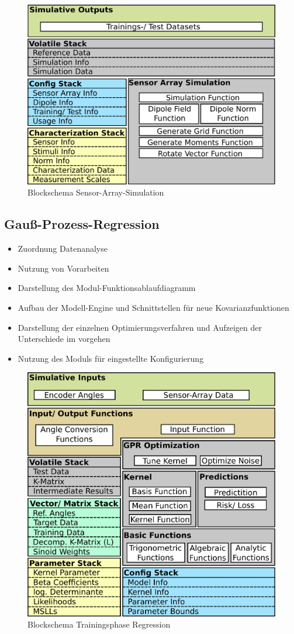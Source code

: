 \begin{figure}[tbph]
	\centering
	\includegraphics[width=0.7\linewidth]{chapters/images/3-SW-E-OExp/Blockschema_Sensor-Array}
	\caption[Blockschema Sensor-Array-Simulation]{Blockschema Sensor-Array-Simulation}
	\label{fig:blockschemasensor-array}
\end{figure}


\clearpage


\subsection{Gauß-Prozess-Regression}\label{sub:gpr-av}
	\begin{itemize}
		\item Zuordnung Datenanalyse
		\item Nutzung von Vorarbeiten
		\item Darstellung des Modul-Funktionsablaufdiagramm
		\item Aufbau der Modell-Engine und Schnittstellen für neue Kovarianzfunktionen
		\item Darstellung der einzelnen Optimierungsverfahren und Aufzeigen der Unterschiede im vorgehen
 		\item Nutzung des Moduls für eingestellte Konfigurierung
	\end{itemize}


\begin{figure}[tbph]
	\centering
	\includegraphics[width=0.7\linewidth]{chapters/images/3-SW-E-OExp/Blockschema_Trainingsphase}
	\caption[Blockschema Trainingsphase Regression]{Blockschema Trainingsphase Regression}
	\label{fig:blockschematrainingsphase}
\end{figure}

